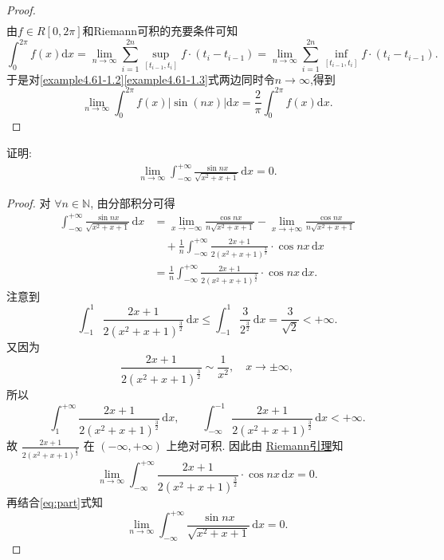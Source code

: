 \documentclass[../../main.tex]{subfiles}%
\begin{document}
\begin{proof}
\begin{align}
\end{align}
由\(f\in R[0, 2\pi]\)和Riemann可积的充要条件可知
\[
\int_0^{2\pi}{f(x)\mathrm{d}x}=\lim_{n\rightarrow \infty}\sum_{i = 1}^{2n}{\sup_{[t_{i - 1}, t_i]}f\cdot(t_i - t_{i - 1})}=\lim_{n\rightarrow \infty}\sum_{i = 1}^{2n}{\inf_{[t_{i - 1}, t_i]}f\cdot(t_i - t_{i - 1})}.
\]
于是对\eqref{example4.61-1.2}\eqref{example4.61-1.3}式两边同时令\(n\rightarrow \infty\),得到
\[
\lim_{n\rightarrow \infty}\int_0^{2\pi}{f(x)|\sin(nx)|\mathrm{d}x}=\frac{2}{\pi}\int_0^{2\pi}{f(x)\mathrm{d}x}.
\]\end{proof}

\begin{example}
证明:
\begin{align*}
\lim_{n\to\infty} \int_{-\infty}^{+\infty} \frac{\sin nx}{\sqrt{x^2+x+1}} \, \mathrm{d}x = 0.
\end{align*}
\end{example}
\begin{proof}
对 $\forall n\in \mathbb{N}$, 由分部积分可得
\begin{align}
\int_{-\infty}^{+\infty} \frac{\sin nx}{\sqrt{x^2+x+1}} \, \mathrm{d}x 
&= \lim_{x\to -\infty} \frac{\cos nx}{n\sqrt{x^2+x+1}} - \lim_{x\to +\infty} \frac{\cos nx}{n\sqrt{x^2+x+1}} \nonumber \\
&\quad + \frac{1}{n} \int_{-\infty}^{+\infty} \frac{2x+1}{2(x^2+x+1)^{\frac{3}{2}}} \cdot \cos nx \, \mathrm{d}x \nonumber \\
&= \frac{1}{n} \int_{-\infty}^{+\infty} \frac{2x+1}{2(x^2+x+1)^{\frac{3}{2}}} \cdot \cos nx \, \mathrm{d}x. \label{eq:part}
\end{align}
注意到
\[
\int_{-1}^1 \frac{2x+1}{2(x^2+x+1)^{\frac{3}{2}}} \, \mathrm{d}x \leqslant \int_{-1}^1 \frac{3}{2^{\frac{3}{2}}} \, \mathrm{d}x = \frac{3}{\sqrt{2}} < +\infty.
\]
又因为
\[
\frac{2x+1}{2(x^2+x+1)^{\frac{3}{2}}} \sim \frac{1}{x^2}, \quad x\to \pm\infty,
\]
所以
\[
\int_1^{+\infty} \frac{2x+1}{2(x^2+x+1)^{\frac{3}{2}}} \, \mathrm{d}x, \qquad \int_{-\infty}^{-1} \frac{2x+1}{2(x^2+x+1)^{\frac{3}{2}}} \, \mathrm{d}x < +\infty.
\]
故 $\frac{2x+1}{2(x^2+x+1)^{\frac{3}{2}}}$ 在 $(-\infty,+\infty)$ 上绝对可积. 因此由 \hyperref[theorem:Riemann引理]{Riemann引理}知
\[
\lim_{n\to\infty} \int_{-\infty}^{+\infty} \frac{2x+1}{2(x^2+x+1)^{\frac{3}{2}}} \cdot \cos nx \, \mathrm{d}x = 0.
\]
再结合\eqref{eq:part}式知
\[
\lim_{n\to\infty} \int_{-\infty}^{+\infty} \frac{\sin nx}{\sqrt{x^2+x+1}} \, \mathrm{d}x = 0.
\]\end{proof}
\end{document}
